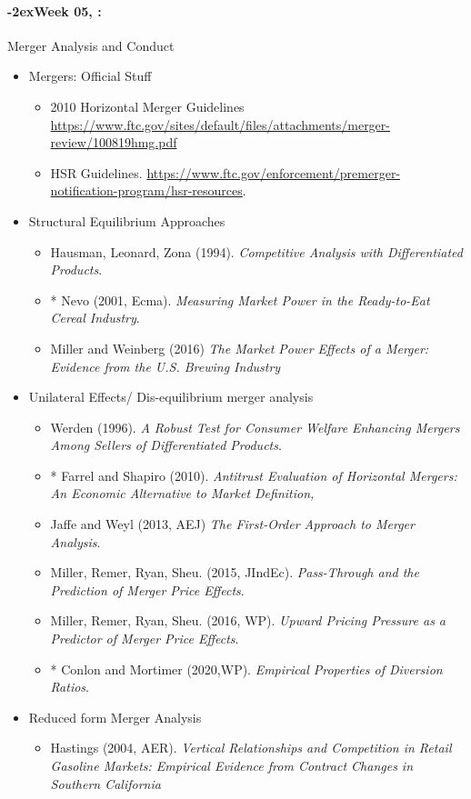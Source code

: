 \documentclass[11pt]{article}
\newcommand{\week}[1]{%
  \paragraph*{\kern-2ex\quad #1, \syldate{\today}:}%
  \ifdim\wd1=\wd\THURSDAY
    \AdvanceDate[7]
  \else
    \AdvanceDate[7]
  \fi%
}
\begin{document}
\week{Week 05} Merger Analysis and Conduct 
\begin{itemize}
\item Mergers: Official Stuff
\begin{itemize}
\item 2010 Horizontal Merger Guidelines \url{https://www.ftc.gov/sites/default/files/attachments/merger-review/100819hmg.pdf}
\item HSR Guidelines. \url{https://www.ftc.gov/enforcement/premerger-notification-program/hsr-resources}.
\end{itemize}
\item Structural Equilibrium Approaches
\begin{itemize}
\item Hausman, Leonard, Zona (1994). \textit{Competitive Analysis with Differentiated Products}.
\item * Nevo (2001, Ecma). \textit{Measuring Market Power in the Ready-to-Eat Cereal Industry}.
\item Miller and Weinberg (2016) \textit{The Market Power Effects of a Merger: Evidence from the U.S. Brewing Industry}
\end{itemize}
\item Unilateral Effects/ Dis-equilibrium merger analysis
\begin{itemize}
\item Werden (1996). \textit{A Robust Test for Consumer Welfare Enhancing
Mergers Among Sellers of Differentiated Products}.
\item * Farrel and Shapiro (2010). \textit{Antitrust Evaluation of Horizontal Mergers: An Economic Alternative to Market Definition,}
\item Jaffe and Weyl (2013, AEJ) \textit{The First-Order Approach to Merger Analysis}.
\item Miller, Remer, Ryan, Sheu. (2015, JIndEc). \textit{Pass-Through and the Prediction of Merger Price Effects}.
\item Miller, Remer, Ryan, Sheu. (2016, WP). \textit{Upward Pricing Pressure as a Predictor of Merger Price Effects}.
\item * Conlon and Mortimer (2020,WP). \textit{Empirical Properties of Diversion Ratios}.
\end{itemize}
\item Reduced form Merger Analysis
\begin{itemize}
\item Hastings (2004, AER). \textit{Vertical Relationships and Competition in Retail Gasoline Markets: Empirical Evidence from Contract Changes in Southern California}

\end{itemize}
\end{itemize}
\end{document}
